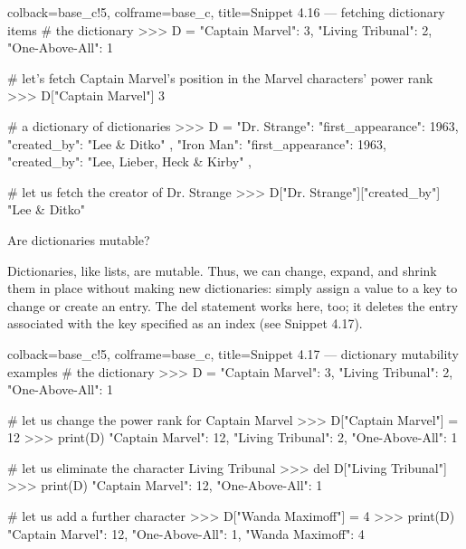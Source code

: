 \documentclass[a4paper,11pt]{book}
\newcommand{\question}[1]{%
    \begin{tcolorbox}[colback=comp_c!10,colframe=comp_c,sidebyside align=top,width=\linewidth,before skip=1ex]
        #1
    \end{tcolorbox}
    \switchcolumn%
}
\newcommand{\note}[1]{%
    \begin{tcolorbox}[colback=white!0,colframe=white!10,width=\linewidth,before skip=1ex]
        #1
    \end{tcolorbox}
}
\begin{document}
\begin{pythoncode}[linenos=true,]{colback=base_c!5, colframe=base_c, title=\sffamily Snippet 4.16 --- fetching dictionary items}
# the dictionary 
>>> D = {"Captain Marvel": 3, "Living Tribunal": 2, "One-Above-All": 1}

# let's fetch Captain Marvel's position in the Marvel characters' power rank
>>> D["Captain Marvel"]
3

# a dictionary of dictionaries
>>> D = {
	"Dr. Strange": {
		"first_appearance": 1963,
		"created_by": "Lee & Ditko"
		},
	"Iron Man": {
		"first_appearance": 1963,
		"created_by": "Lee, Lieber, Heck & Kirby"
		},
    } 

# let us fetch the creator of Dr. Strange 
>>> D["Dr. Strange"]["created_by"]
"Lee & Ditko"
\end{pythoncode}

\begin{paracol}{2}
\question{\raggedright Are dictionaries mutable?}
\note{Dictionaries, like lists, are mutable. Thus, we can change, expand, and shrink them in place without making new dictionaries: simply assign a value to a key to change or create an entry. The del statement works here, too; it deletes the entry associated with the key specified as an index (see Snippet 4.17).}
\end{paracol}

\begin{pythoncode}[linenos=true,]{colback=base_c!5, colframe=base_c, title=\sffamily Snippet 4.17 --- dictionary mutability examples}
# the dictionary 
>>> D = {"Captain Marvel": 3, "Living Tribunal": 2, "One-Above-All": 1}

# let us change the power rank for Captain Marvel
>>> D["Captain Marvel"] = 12
>>> print(D)
{"Captain Marvel": 12, "Living Tribunal": 2, "One-Above-All": 1}

# let us eliminate the character Living Tribunal 
>>> del D["Living Tribunal"]
>>> print(D)
{"Captain Marvel": 12, "One-Above-All": 1}

# let us add a further character 
>>> D["Wanda Maximoff"] = 4
>>> print(D)
{"Captain Marvel": 12, "One-Above-All": 1, "Wanda Maximoff": 4}

\end{pythoncode}
\end{document}
